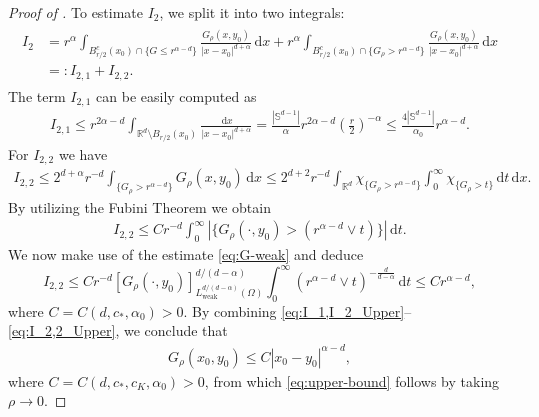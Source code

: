 \documentclass[reqno]{amsart}
\theoremstyle{plain}
\theoremstyle{definition}
\numberwithin{equation}{section}
\newcommand{\Rd}{\mathbb{R}^d}
\newcommand{\dx} {\, \mathrm{d}x}
\newcommand{\dt} {\, \mathrm{d}t}
\newcommand{\cl} {c_{\ast}}
\newcommand{\cK} {c_K}
\begin{document}
\begin{proof} [Proof of ]
To estimate $I_2$, we split it into two integrals:
\begin{align}
\begin{split} \label{eq:I_2_Upper}
I_2 
&= r^\alpha \int_{B_{r/2}^c (x_0) \cap \lbrace G \leq r^{\alpha-d} \rbrace} 
\frac{G_{\rho}(x, y_0)}{| x-x_0 |^{d+\alpha}} \dx 
+ r^\alpha \int_{B_{r/2}^c (x_0) \cap \lbrace G_{\rho} > r^{\alpha-d} \rbrace} 
\frac{G_{\rho}(x, y_0)}{| x-x_0 |^{d+\alpha}} \dx \\
&=: I_{2,1} + I_{2,2}.
\end{split}
\end{align}
The term $I_{2,1}$ can be easily computed as
\begin{align} \label{eq:I_2,1_Upper}
I_{2,1} 
\leq r^{2\alpha-d} \int_{\Rd \setminus B_{r/2}(x_0)} \frac{\dx} {| x-x_0 |^{d+\alpha}} 
= \frac{|\mathbb{S}^{d-1}|}{\alpha} r^{2\alpha-d} \left( \frac{r}{2} \right)^{-\alpha} 
\leq \frac{4|\mathbb{S}^{d-1}|}{\alpha_0} r^{\alpha-d}.
\end{align}
For $I_{2,2}$ we have
\begin{align*}
I_{2,2} 
\leq 2^{d+\alpha} r^{-d} \int_{\lbrace G_{\rho} > r^{\alpha-d} \rbrace} G_{\rho}(x, y_0) \dx 
\leq 2^{d+2} r^{-d} \int_{\Rd} \chi_{\lbrace G_{\rho} > r^{\alpha-d} \rbrace} 
\int_0^\infty \chi_{\lbrace G_{\rho} > t \rbrace} \dt \dx.
\end{align*}
By utilizing the Fubini Theorem we obtain
\begin{align*}
I_{2,2} 
\leq Cr^{-d} \int_0^\infty \left| \lbrace G_{\rho}(\cdot, y_0) > (r^{\alpha-d} \lor t) \rbrace \right| \dt.
\end{align*}
We now make use of the estimate \eqref{eq:G-weak} and deduce
\begin{equation} \label{eq:I_2,2_Upper}
I_{2,2} \leq C r^{-d} [G_{\rho}(\cdot, y_0)]_{L^{d/(d-\alpha)}_\mathrm{weak}
(\Omega)}^{d/(d-\alpha)} \int_0^\infty (r^{\alpha-d} \lor t)^{-\frac{d}{d-\alpha}} \dt \leq C r^{\alpha-d},
\end{equation}
where $C = C(d, \cl, \alpha_0) > 0$. By combining \eqref{eq:I_1,I_2_Upper}--\eqref{eq:I_2,2_Upper}, we conclude that
\begin{align*}
G_{\rho}(x_0, y_0) \leq C |x_0-y_0|^{\alpha-d},
\end{align*}
where $C = C(d, \cl, \cK, \alpha_0) > 0$, from which \eqref{eq:upper-bound} follows by taking $\rho \to 0$.


\end{proof}
\end{document}
